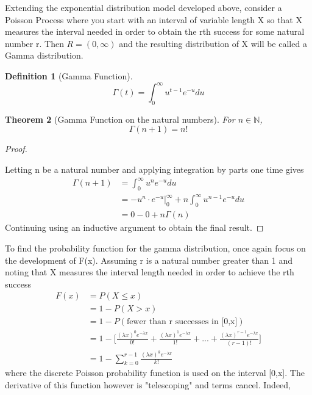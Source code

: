 \documentclass[10pt,]{book}
\theoremstyle{plain}
\newtheorem{theorem}{Theorem}[section]
\theoremstyle{definition}
\newtheorem{definition}[theorem]{Definition}
\theoremstyle{definition}
\theoremstyle{definition}
\numberwithin{equation}{section}
\newcommand{\gt}{ > }
\begin{document}
Extending the exponential distribution model developed above, consider a Poisson Process where you start with an interval of variable length X so that X measures the interval needed in order to obtain the rth success for some natural number r. Then \(R = (0,\infty)\) and the resulting distribution of X will be called a Gamma distribution.
%
\begin{definition}[{Gamma Function}]\label{definition-33}
\begin{equation*}\Gamma(t) = \int_0^{\infty} u^{t-1} e^{-u} du\end{equation*}\end{definition}
\begin{theorem}[{Gamma Function on the natural numbers}]\label{theorem-53}
For \(n \in \mathbb{N}\),
\begin{equation*}\Gamma(n+1) = n!\end{equation*}
%
\end{theorem}
\begin{proof}\hypertarget{proof-52}{}

Letting n be a natural number and applying integration by parts one time gives
\begin{align*}
\Gamma(n+1) & = \int_0^{\infty} u^n e^{-u} du\\
 & = -u^n \cdot e^{-u} \big |_0^{\infty} + n \int_0^{\infty} u^{n-1} e^{-u} du \\
 & = 0 - 0 + n \Gamma(n)
\end{align*}
Continuing using an inductive argument to obtain the final result.
%
\end{proof}
\par
To find the probability function for the gamma distribution, once again focus on the development of F(x). Assuming r is a natural number greater than 1 and noting that X measures the interval length needed in order to achieve the rth success
\begin{align*}
F(x) & = P(X \le x)\\
 & = 1 - P(X \gt x)\\
 & = 1 - P(\text{fewer than r successes in [0,x]})\\
 & = 1 - \big [ \frac{(\lambda x)^0 e^{-\lambda x}}{0!} + \frac{(\lambda x)^1 e^{-\lambda x}}{1!} + ... + \frac{(\lambda x)^{r-1} e^{-\lambda x}}{(r-1)!} \big ]\\
 & = 1 - \sum_{k=0}^{r-1} \frac{(\lambda x)^k e^{-\lambda x}}{k!} 
\end{align*}
where the discrete Poisson probability function is used on the interval [0,x]. The derivative of this function however is "telescoping" and terms cancel. Indeed,
\end{document}
